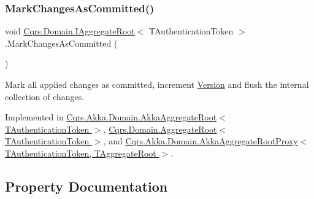 \mbox{\label{interfaceCqrs_1_1Domain_1_1IAggregateRoot_af31116870bbf6566b3eec0b8bc02c6de_af31116870bbf6566b3eec0b8bc02c6de}} 
\subsubsection{\texorpdfstring{Mark\+Changes\+As\+Committed()}{MarkChangesAsCommitted()}}
{\footnotesize\ttfamily void \hyperlink{interfaceCqrs_1_1Domain_1_1IAggregateRoot}{Cqrs.\+Domain.\+I\+Aggregate\+Root}$<$ T\+Authentication\+Token $>$.Mark\+Changes\+As\+Committed (\begin{DoxyParamCaption}{ }\end{DoxyParamCaption})}



Mark all applied changes as committed, increment \hyperlink{interfaceCqrs_1_1Domain_1_1IAggregateRoot_ad81adab68c0984330f735a1f5a661aa7_ad81adab68c0984330f735a1f5a661aa7}{Version} and flush the internal collection of changes. 



Implemented in \hyperlink{classCqrs_1_1Akka_1_1Domain_1_1AkkaAggregateRoot_a0d2615067175e5f8249bb2dc3d17ee0b_a0d2615067175e5f8249bb2dc3d17ee0b}{Cqrs.\+Akka.\+Domain.\+Akka\+Aggregate\+Root$<$ T\+Authentication\+Token $>$}, \hyperlink{classCqrs_1_1Domain_1_1AggregateRoot_adab968b830e186cb832583910bf6f3a6_adab968b830e186cb832583910bf6f3a6}{Cqrs.\+Domain.\+Aggregate\+Root$<$ T\+Authentication\+Token $>$}, and \hyperlink{classCqrs_1_1Akka_1_1Domain_1_1AkkaAggregateRootProxy_aaa8a46fee21b6133ae4d1b2f60983d7e_aaa8a46fee21b6133ae4d1b2f60983d7e}{Cqrs.\+Akka.\+Domain.\+Akka\+Aggregate\+Root\+Proxy$<$ T\+Authentication\+Token, T\+Aggregate\+Root $>$}.



\subsection{Property Documentation}
\mbox{\label{interfaceCqrs_1_1Domain_1_1IAggregateRoot_a04aa3198f1371afa345a58e8fcb713d7_a04aa3198f1371afa345a58e8fcb713d7}} 
